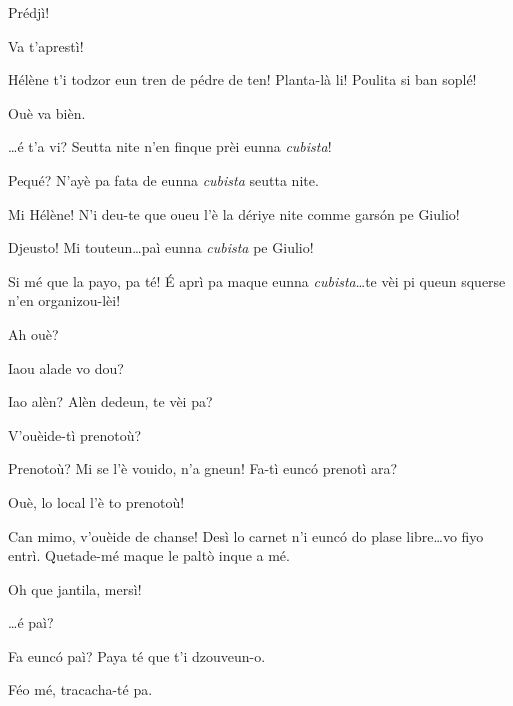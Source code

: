 \begin{drama}
\Helenespeaks Prédjì!

\Bertaspeaks{} Va t'aprestì!


\Bertaspeaks Hélène t'i todzor eun tren de pédre de ten! Planta-là li! Poulita si ban soplé!

\Helenespeaks Ouè va bièn.

\Bertaspeaks \ldots é t'a vi? Seutta nite n'en finque prèi eunna \textit{cubista}!

\Helenespeaks Pequé? N'ayè pa fata de eunna \textit{cubista} seutta nite.

\Bertaspeaks Mi Hélène! N'i deu-te que oueu l'è la dériye nite comme gars\'on pe Giulio!

\Helenespeaks Djeusto! Mi touteun\ldots paì eunna \textit{cubista} pe Giulio!

\Bertaspeaks Si mé que la payo, pa té! \'E aprì pa maque eunna \textit{cubista}\ldots te vèi pi queun squerse n'en organizou-lèi!

\Helenespeaks Ah ouè?




\Dorinaspeaks Iaou alade vo dou?

\Pierrespeaks Iao alèn? Alèn dedeun, te vèi pa?

\Dorinaspeaks V'ouèide-tì prenotoù?

\Pierrespeaks Prenotoù? Mi se l'è vouido, n'a gneun! Fa-tì eunc\'o prenotì ara?

\Dorinaspeaks Ouè, lo local l'è to prenotoù!

\Dorinaspeaks Can mimo, v'ouèide de chanse! Desì lo carnet n'i eunc\'o do plase libre\ldots vo fiyo entrì. Quetade-mé maque le palt\`o inque a mé.

\Pierrespeaks Oh que jantila, mersì!


\Dorinaspeaks \ldots é paì?

\Pierrespeaks Fa eunc\'o paì? Paya té que t'i dzouveun-o.

\Louisspeaks Féo mé, tracacha-té pa.


\end{drama}
